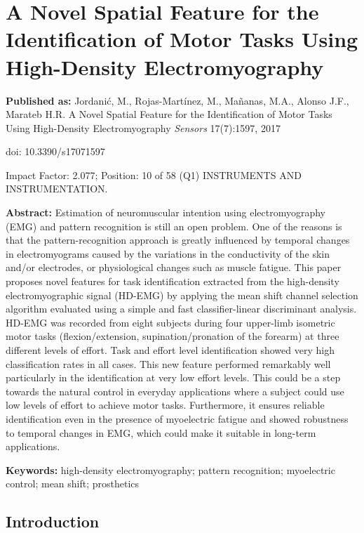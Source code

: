 \chapter[A Novel feature for task identification]{A Novel Spatial Feature for the Identification of Motor Tasks Using High-Density Electromyography}
\label{ch:p3}
\textbf{Published as:} 
Jordanić, M., Rojas-Martínez, M., Ma\~nanas, M.A., Alonso J.F., Marateb H.R.
A Novel Spatial Feature for the Identification of Motor Tasks Using High-Density Electromyography 
\textit{Sensors} 17(7):1597, 2017

doi: 10.3390/s17071597

Impact Factor: 2.077; Position: 10 of 58 (Q1) INSTRUMENTS AND INSTRUMENTATION.


\textbf{Abstract:} Estimation of neuromuscular intention using electromyography (EMG) and pattern recognition is still an open problem. One of the reasons is that the pattern-recognition approach is greatly influenced by temporal changes in electromyograms caused by the variations in the conductivity of the skin and/or electrodes, or physiological changes such as muscle fatigue. This paper proposes novel features for task identification extracted from the high-density electromyographic signal (HD-EMG) by applying the mean shift channel selection algorithm evaluated using a simple and fast classifier-linear discriminant analysis. HD-EMG was recorded from eight subjects during four upper-limb isometric motor tasks (flexion/extension, supination/pronation of the forearm) at three different levels of effort. Task and effort level identification showed very high classification rates in all cases. This new feature performed remarkably well particularly in the identification at very low effort levels. This could be a step towards the natural control in everyday applications where a subject could use low levels of effort to achieve motor tasks. Furthermore, it ensures reliable identification even in the presence of myoelectric fatigue and showed robustness to temporal changes in EMG, which could make it suitable in long-term applications.

\textbf{Keywords:}  high-density electromyography; pattern recognition; myoelectric control; mean shift; prosthetics

\section{Introduction}

